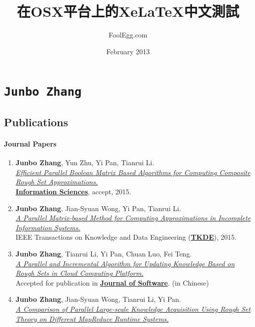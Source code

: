 \documentclass[10pt,a4paper]{article}
\title{\huge 在OSX平台上的XeLaTeX中文測試} %
\author{FoolEgg.com} 		%
\date{February 2013} 		%
\author{}
\date{}
\begin{document}
\section{\texttt{Junbo Zhang}}\label{section}

\subsection{Publications}\label{publications}

\small

\paragraph{Journal Papers}\label{journal-papers}

\begin{enumerate}
\def\labelenumi{\arabic{enumi}.}
\item
  \textbf{Junbo Zhang}, Yun Zhu, Yi Pan, Tianrui Li.\\
  \href{}{\emph{Efficient Parallel Boolean Matrix Based Algorithms for
  Computing Composite Rough Set Approximations.}}\\
  \href{http://www.journals.elsevier.com/information-sciences}{\textbf{Information
  Sciences}}, accept, 2015.
\item
  \textbf{Junbo Zhang}, Jian-Syuan Wong, Yi Pan, Tianrui Li.\\
  \href{http://dx.doi.org/10.1109/TKDE.2014.2330821}{\emph{A Parallel
  Matrix-based Method for Computing Approximations in Incomplete
  Information Systems.}}\\ IEEE Transactions on Knowledge and Data
  Engineering
  (\href{http://www.computer.org/portal/web/tkde}{\textbf{TKDE}}), 2015.
\item
  \textbf{Junbo Zhang}, Tianrui Li, Yi Pan, Chuan Luo, Fei Teng.\\
  \href{http://dx.doi.org/10.13328/j.cnki.jos.004590}{\emph{A Parallel
  and Incremental Algorithm for Updating Knowledge Based on Rough Sets
  in Cloud Computing Platform.}}\\ Accepted for publication in
  \href{http://www.jos.org.cn/ch/index.aspx}{\textbf{Journal of
  Software}}. (in Chinese)
\item
  \textbf{Junbo Zhang}, Jian-Syuan Wong, Tianrui Li, Yi Pan.\\
  \href{http://dx.doi.org/10.1016/j.ijar.2013.08.003}{\emph{A Comparison
  of Parallel Large-scale Knowledge Acquisition Using Rough Set Theory
  on Different MapReduce Runtime Systems.}}\\

\end{enumerate}
\end{document}
